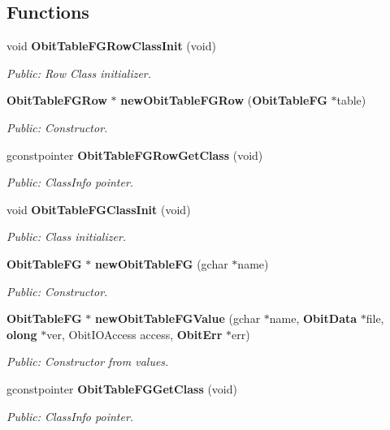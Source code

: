 \subsection*{Functions}
\begin{CompactItemize}
\item 
void {\bf Obit\-Table\-FGRow\-Class\-Init} (void)
\begin{CompactList}\small\item\em Public: Row Class initializer. \item\end{CompactList}\item 
{\bf Obit\-Table\-FGRow} $\ast$ {\bf new\-Obit\-Table\-FGRow} ({\bf Obit\-Table\-FG} $\ast$table)
\begin{CompactList}\small\item\em Public: Constructor. \item\end{CompactList}\item 
gconstpointer {\bf Obit\-Table\-FGRow\-Get\-Class} (void)
\begin{CompactList}\small\item\em Public: Class\-Info pointer. \item\end{CompactList}\item 
void {\bf Obit\-Table\-FGClass\-Init} (void)
\begin{CompactList}\small\item\em Public: Class initializer. \item\end{CompactList}\item 
{\bf Obit\-Table\-FG} $\ast$ {\bf new\-Obit\-Table\-FG} (gchar $\ast$name)
\begin{CompactList}\small\item\em Public: Constructor. \item\end{CompactList}\item 
{\bf Obit\-Table\-FG} $\ast$ {\bf new\-Obit\-Table\-FGValue} (gchar $\ast$name, {\bf Obit\-Data} $\ast$file, {\bf olong} $\ast$ver, Obit\-IOAccess access, {\bf Obit\-Err} $\ast$err)
\begin{CompactList}\small\item\em Public: Constructor from values. \item\end{CompactList}\item 
gconstpointer {\bf Obit\-Table\-FGGet\-Class} (void)
\begin{CompactList}\small\item\em Public: Class\-Info pointer. \item\end{CompactList}\item 

\end{CompactItemize}
